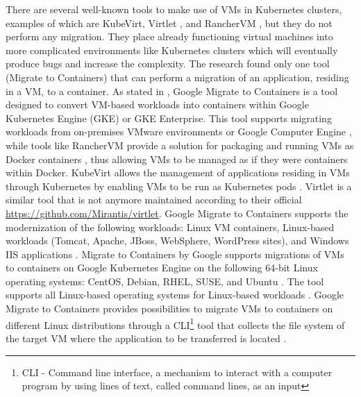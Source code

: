 \documentclass[twocolumn]{article}
\begin{document}
There are several well-known tools to make use of VMs in Kubernetes clusters, examples of which are KubeVirt, Virtlet \cite{Sheldon-2022}, and RancherVM \cite{Baccini-2021}, but they do not perform any migration. They place already functioning virtual machines into more complicated environments like Kubernetes clusters which will eventually produce bugs and increase the complexity. The research found only one tool (Migrate to Containers\cite{Google-2024}) that can perform a migration of an application, residing in a VM, to a container. As stated in \cite{Google-2024}, Google Migrate to Containers is a tool designed to convert VM-based workloads into containers within Google Kubernetes Engine (GKE) or GKE Enterprise. This tool supports migrating workloads from on-premises VMware environments or Google Computer Engine \cite{Google-2024}, while tools like RancherVM provide a solution for packaging and running VMs as Docker containers \cite{Baccini-2021}, thus allowing VMs to be managed as if they were containers within Docker. KubeVirt allows the management of applications residing in VMs through Kubernetes by enabling VMs to be run as Kubernetes pods \cite{Sheldon-2022}. Virtlet is a similar tool \cite{Sheldon-2022} that is not anymore maintained according to their official \href{Github repository}{https://github.com/Mirantis/virtlet}.
Google Migrate to Containers supports the modernization of the following workloads: Linux VM containers, Linux-based workloads (Tomcat, Apache, JBoss, WebSphere, WordPress sites), and Windows IIS applications \cite{Google-2024}. Migrate to Containers by Google supports migrations of VMs to containers on Google Kubernetes Engine on the following 64-bit Linux operating systems: CentOS, Debian, RHEL, SUSE, and Ubuntu \cite{Google-2024}. The tool supports all Linux-based operating systems for Linux-based workloads \cite{Google-2024}. Google Migrate to Containers provides possibilities to migrate VMs to containers on different Linux distributions through a CLI\footnote{CLI - Command line interface, a mechanism to interact with a computer program by using lines of text, called command lines, as an input} tool that collects the file system of the target VM where the application to be transferred is located \cite{Google-2024}. 
\end{document}
